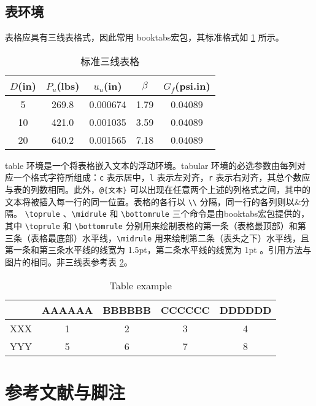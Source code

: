 \section{表环境}
表格应具有三线表格式，因此常用 booktabs宏包，其标准格式如 \ref{tab:mytab} 所示。
\begin{table}[!htbp]
    \caption{标准三线表格}\label{tab:mytab} \centering
    \begin{tabular}{ccccc}
        \toprule[1.5pt]
        $D$(in) & $P_u$(lbs) & $u_u$(in) & $\beta$ & $G_f$(psi.in)\\
        \midrule[1pt]
        5 & 269.8 & 0.000674 & 1.79 & 0.04089\\
        10 & 421.0 & 0.001035 & 3.59 & 0.04089\\
        20 & 640.2 & 0.001565 & 7.18 & 0.04089\\
        \bottomrule[1.5pt]
    \end{tabular}
\end{table}

table 环境是一个将表格嵌入文本的浮动环境。tabular 环境的必选参数由每列对应一个格式字符所组成：\verb|c| 表示居中，\verb|l| 表示左对齐，\verb|r| 表示右对齐，其总个数应与表的列数相同。此外，\verb|@{文本}| 可以出现在任意两个上述的列格式之间，其中的文本将被插入每一行的同一位置。表格的各行以 \verb|\\| 分隔，同一行的各列则以\&分隔。 \verb|\toprule| 、\verb|\midrule| 和 \verb|\bottomrule| 三个命令是由booktabs宏包提供的，其中 \verb|\toprule| 和 \verb|\bottomrule| 分别用来绘制表格的第一条（表格最顶部）和第三条（表格最底部）水平线，\verb|\midrule| 用来绘制第二条（表头之下）水平线，且第一条和第三条水平线的线宽为 1.5pt，第二条水平线的线宽为 1pt 。引用方法与图片的相同。非三线表参考表 \ref{tab:Table-example}。
\begin{table}[!htb]
\centering
\caption{Table example}\label{tab:Table-example}
\begin{tabular}{|c|c|c|c|c|}
\hline 
 & AAAAAA & BBBBBB & CCCCCC & DDDDDD\tabularnewline
\hline 
XXX & 1 & 2 & 3 & 4\tabularnewline
\hline 
YYY & 5 & 6 & 7 & 8\tabularnewline
\hline 
\end{tabular}
\end{table}



\chapter{参考文献与脚注}

